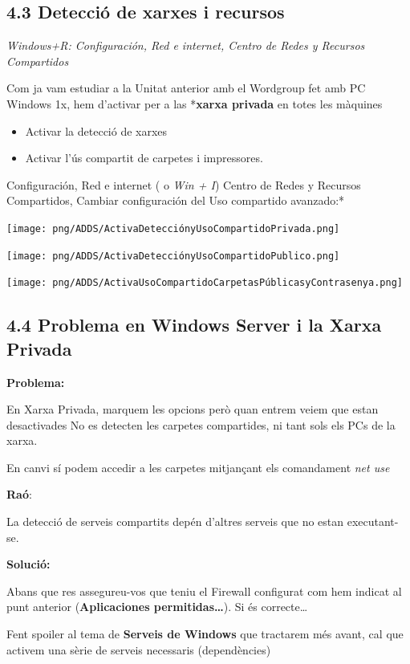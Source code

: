 \documentclass[
  a4paper,
]{article}
\begin{document}
\subsection{4.3 Detecció de xarxes i
recursos}\label{detecciuxf3-de-xarxes-i-recursos}

\emph{Windows+R: Configuración, Red e internet, Centro de Redes y
Recursos Compartidos}

Com ja vam estudiar a la Unitat anterior amb el Wordgroup fet amb PC
Windows 1x, hem d'activar per a las *\textbf{xarxa privada} en totes les
màquines

\begin{itemize}
\item
  Activar la detecció de xarxes
\item
  Activar l'ús compartit de carpetes i impressores.
\end{itemize}

Configuración, Red e internet ( o \emph{Win + I}) Centro de Redes y
Recursos Compartidos, Cambiar configuración del Uso compartido
avanzado:*

\texttt{[image: png/ADDS/ActivaDetecciónyUsoCompartidoPrivada.png]}

\texttt{[image: png/ADDS/ActivaDetecciónyUsoCompartidoPublico.png]}

\texttt{[image: png/ADDS/ActivaUsoCompartidoCarpetasPúblicasyContrasenya.png]}

\subsection{4.4 Problema en Windows Server i la Xarxa
Privada}\label{problema-en-windows-server-i-la-xarxa-privada}

\textbf{Problema:}

En Xarxa Privada, marquem les opcions però quan entrem veiem que estan
desactivades No es detecten les carpetes compartides, ni tant sols els
PCs de la xarxa.

En canvi sí podem accedir a les carpetes mitjançant els comandament
\emph{net use}

\textbf{Raó}:

La detecció de serveis compartits depén d'altres serveis que no estan
executant-se.

\textbf{Solució:}

Abans que res assegureu-vos que teniu el Firewall configurat com hem
indicat al punt anterior (\textbf{Aplicaciones permitidas\ldots{}}). Si
és correcte\ldots{}

Fent spoiler al tema de \textbf{Serveis de Windows} que tractarem més
avant, cal que activem una sèrie de serveis necessaris (dependències)
\end{document}
